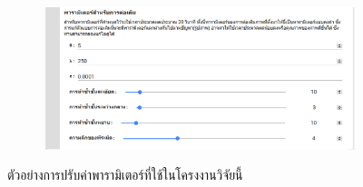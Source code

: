 \begin{figure}[H]
    \centering
    \begin{subfigure}{0.8\linewidth}
        \centering
        \includegraphics[width=1\linewidth]{image/appendix_colab/select_parameter.png}
    \end{subfigure}
    \caption{ตัวอย่างการปรับค่าพารามิเตอร์ที่ใช้ในโครงงานวิจัยนี้}
\end{figure}